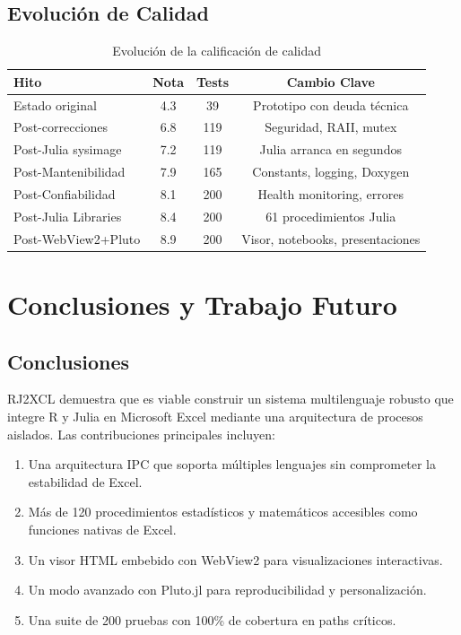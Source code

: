 \documentclass[12pt, a4paper]{report}
\begin{document}
\section{Evolución de Calidad}

\begin{table}[h]
\centering
\begin{tabular}{lccc}
\toprule
\textbf{Hito} & \textbf{Nota} & \textbf{Tests} & \textbf{Cambio Clave} \\
\midrule
Estado original & 4.3 & 39 & Prototipo con deuda técnica \\
Post-correcciones & 6.8 & 119 & Seguridad, RAII, mutex \\
Post-Julia sysimage & 7.2 & 119 & Julia arranca en segundos \\
Post-Mantenibilidad & 7.9 & 165 & Constants, logging, Doxygen \\
Post-Confiabilidad & 8.1 & 200 & Health monitoring, errores \\
Post-Julia Libraries & 8.4 & 200 & 61 procedimientos Julia \\
Post-WebView2+Pluto & 8.9 & 200 & Visor, notebooks, presentaciones \\
\bottomrule
\end{tabular}
\caption{Evolución de la calificación de calidad}
\end{table}

\chapter{Conclusiones y Trabajo Futuro}

\section{Conclusiones}

RJ2XCL demuestra que es viable construir un sistema multilenguaje robusto que integre R y Julia en Microsoft Excel mediante una arquitectura de procesos aislados. Las contribuciones principales incluyen:

\begin{enumerate}
    \item Una arquitectura IPC que soporta múltiples lenguajes sin comprometer la estabilidad de Excel.
    \item Más de 120 procedimientos estadísticos y matemáticos accesibles como funciones nativas de Excel.
    \item Un visor HTML embebido con WebView2 para visualizaciones interactivas.
    \item Un modo avanzado con Pluto.jl para reproducibilidad y personalización.
    \item Una suite de 200 pruebas con 100\% de cobertura en paths críticos.
\end{enumerate}
\end{document}
